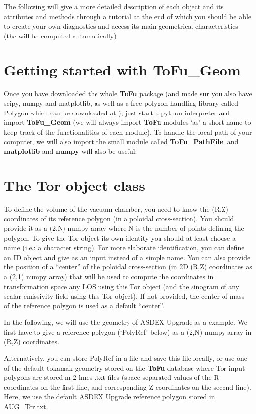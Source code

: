 \documentclass[letterpaper,10pt,english]{sphinxmanual}
\begin{document}
The following will give a more detailed description of each object and its attributes and methods through a tutorial at the end of which you should be able to create your own diagnostics and access its main geometrical characteristics (the will be computed automatically).


\chapter{Getting started with \textbf{ToFu\_Geom}}
\label{ToFu_Geom:getting-started-with-tofu-geom}
Once you have downloaded the whole \textbf{ToFu} package (and made sur you also have scipy, numpy and matplotlib, as well as a free polygon-handling library called Polygon which can be downloaded at ), just start a python interpreter and import \textbf{ToFu\_Geom} (we will always import \textbf{ToFu} modules `as' a short name to keep track of the functionalities of each module). To handle the local path of your computer, we will also import the small module called \textbf{ToFu\_PathFile}, and \textbf{matplotlib} and \textbf{numpy} will also be useful:


\chapter{The Tor object class}
\label{ToFu_Geom:the-tor-object-class}
To define the volume of the vacuum chamber, you need to know the (R,Z) coordinates of its reference polygon (in a poloidal cross-section). You should provide it as a (2,N) numpy array where N is the number of points defining the polygon. To give the Tor object its own identity you should at least choose a name (i.e.: a character string). For more elaborate identification, you can define an ID object and give as an input instead of a simple name. You can also provide the position of a ``center'' of the poloidal cross-section (in 2D (R,Z) coordinates as a (2,1) numpy array) that will be used to compute the coordinates in transformation space any LOS using this Tor object (and the sinogram of any scalar emissivity field using this Tor object). If not provided, the center of mass of the reference polygon is used as a default ``center''.

In the following, we will use the geometry of ASDEX Upgrade as a example.
We first have to give a reference polygon (`PolyRef' below) as a (2,N) numpy array in (R,Z) coordinates.

Alternatively, you can store PolyRef in a file and save this file locally, or use one of the default tokamak geometry stored on the \textbf{ToFu} database where Tor input polygons are stored in 2 lines .txt files (space-separated values of the R coordinates on the first line, and corresponding Z coordinates on the second line). Here, we use the default ASDEX Upgrade reference polygon stored in AUG\_Tor.txt.
\end{document}
